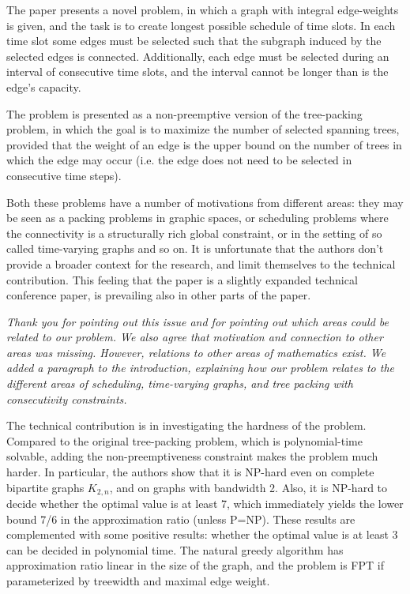 \documentclass[11pt,a4paper]{article}
\begin{document}
The paper presents a novel problem, in which a graph with integral edge-weights
is given, and the task is to create longest possible schedule of time slots. In
each time slot some edges must be selected such that the subgraph induced by
the selected edges is connected. Additionally, each edge must be selected
during an interval of consecutive time slots, and the interval cannot be longer
than is the edge's capacity.

The problem is presented as a non-preemptive version of the tree-packing
problem, in which the goal is to maximize the number of selected spanning
trees, provided that the weight of an edge is the upper bound on the number of
trees in which the edge may occur (i.e. the edge does not need to be selected
in consecutive time steps). 

Both these problems have a number of motivations from different areas: they may
be seen as a packing problems in graphic spaces, or scheduling problems where
the connectivity is a structurally rich global constraint, or in the setting of
so called time-varying graphs and so on. It is unfortunate that the authors
don't provide a broader context for the research, and limit themselves to the
technical contribution. This feeling that the paper is a slightly expanded
technical conference paper, is prevailing also in other parts of the paper.

\textit{Thank you for pointing out this issue and for pointing out which areas could be related to our problem. 
We also agree that motivation and connection to other areas was missing. 
However, relations to other areas of mathematics exist. 
We added a paragraph to the introduction, explaining how our problem relates to the different areas of scheduling, time-varying graphs, and tree packing with consecutivity constraints.}

The technical contribution is in investigating the hardness of the problem.
Compared to the original tree-packing problem, which is polynomial-time
solvable, adding the non-preemptiveness constraint makes the problem much
harder.  In particular, the authors show that it is NP-hard even on complete
bipartite graphs $K_{2,n}$, and on graphs with bandwidth 2. Also, it is NP-hard to
decide whether the optimal value is at least 7, which immediately yields the
lower bound 7/6 in the approximation ratio (unless P=NP). These results are
complemented with some positive results: whether the optimal value is at least 3
can be decided in polynomial time. The natural greedy algorithm has
approximation ratio linear in the size of the graph, and the problem is FPT if
parameterized by treewidth and maximal edge weight.
\end{document}
